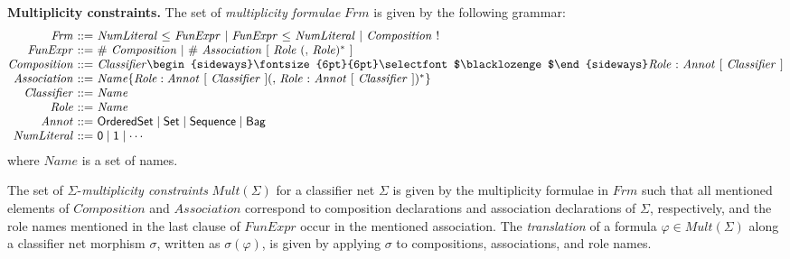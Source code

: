\documentclass[10pt,fleqn,%
\ifpretendfinal
final%
\else
draft%
\fi,
]{scrreprt}
\newcommand{\composition}{\raisebox{0.2pt}{\begin{sideways}\fontsize{6pt}{6pt}\selectfont$\blacklozenge$\end{sideways}}}
\begin{document}
\medskip\noindent\textbf{Multiplicity constraints.}
The set of \emph{multiplicity formulae} $\mathit{Frm}$ is given by
the following grammar:
%
\begin{equation*}
\begin{array}{@{}r@{\ }r@{\ }l@{}}
  \mathit{Frm} & ::= & \mathit{NumLiteral}\ \mathsf{\leq}\ \mathit{FunExpr}\ |\ \mathit{FunExpr}\ \mathsf{\leq}\ \mathit{NumLiteral}\ |\ \mathit{Composition}\ \mathsf{!}
\\
  \mathit{FunExpr} & ::= & \mathit{\#}\ \mathit{Composition}\ |\ \mathit{\#}\ \mathit{Association}\ \mathsf{[}\ \mathit{Role}\ (\mathsf{,}\ \mathit{Role})^*\ \mathsf{]}
\\
  \mathit{Composition} & ::= & \mathit{Classifier}\composition\mathit{Role}\ \mathsf{:}\ \mathit{Annot}\ [\ \mathit{Classifier}\ ]
\\
  \mathit{Association} & ::= & \mathit{Name}\{ \mathit{Role} : \mathit{Annot}\ [\ \mathit{Classifier}\ ](\mathsf{,}\ \mathit{Role}\ \mathsf{:}\ \mathit{Annot}\ [\ \mathit{Classifier}\ ])^* \}
\\
  \mathit{Classifier} & ::= & \mathit{Name}
\\
  \mathit{Role} & ::= & \mathit{Name}
\\
  \mathit{Annot} & ::= & \mathsf{OrderedSet} \mid \mathsf{Set} \mid \mathsf{Sequence} \mid \mathsf{Bag}
\\
  \mathit{NumLiteral} & ::= & \mathsf{0} \mid \mathsf{1} \mid \cdots
\end{array}
\end{equation*}
%
where $\mathit{Name}$ is a set of names.

The set of $\Sigma$-\emph{multiplicity constraints}
$\mathit{Mult}(\Sigma)$ for a classifier net $\Sigma$ is given by the
multiplicity formulae in $\mathit{Frm}$ such that all mentioned
elements of $\mathit{Composition}$ and $\mathit{Association}$ correspond
to composition declarations and association declarations of $\Sigma$,
respectively, and the role names mentioned in the last clause of
$\mathit{FunExpr}$ occur in the mentioned association.  The
\emph{translation} of a formula $\varphi \in \mathit{Mult}(\Sigma)$
along a classifier net morphism $\sigma$, written as
$\sigma(\varphi)$, is given by applying $\sigma$ to compositions,
associations, and role names.
\end{document}
